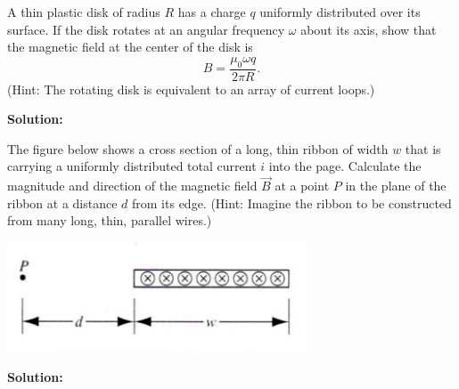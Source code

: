 \documentclass[11pt]{article}
\begin{document}
\vspace*{0.25in}


\begin{problem}[(P33.8)]
A thin plastic disk of radius $R$ has a charge $q$ uniformly distributed over its surface. If the disk rotates at an angular frequency $\omega$ about its axis,
show that the magnetic field at the center of the disk is
\[
	B = \frac{\mu_0\omega q}{2\pi R}.
\]
(Hint: The rotating disk is equivalent to an array of current loops.)
\end{problem}


\textbf{Solution:}\\

\clearpage


\begin{problem}[(P33.8)]
The figure below shows a cross section of a long, thin ribbon of width $w$ that is carrying a uniformly distributed total current $i$ into the page. Calculate the magnitude
and direction of the magnetic field $\vec{B}$ at a point $P$ in the plane of the ribbon at a distance $d$ from its edge. (Hint: Imagine the ribbon to be constructed from many
long, thin, parallel wires.)
\begin{center}
\includegraphics[scale=0.5]{prob2.png}
\end{center}
\end{problem}


\textbf{Solution:}\\

\clearpage
\end{document}
